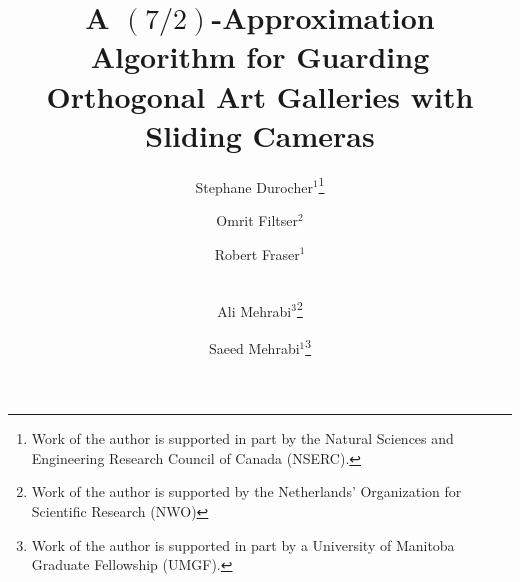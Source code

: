 \documentclass{llncs}
\begin{document}
\let\doendproof\endproof
\renewcommand\endproof{~\hfill\qed\doendproof}



\newcommand{\down}[1]{\raisebox{-.4ex}{#1}}



\makeatletter
    \renewcommand*{\@fnsymbol}[1]{\ensuremath{\ifcase#1\or *\or \dagger\or \S\or
       \mathsection\or \mathparagraph\or \|\or **\or \dagger\dagger
       \or \ddagger\ddagger \else\@ctrerr\fi}}
\makeatother

\newcommand*\samethanks[1][\value{footnote}]{\footnotemark[#1]}

\title{A \boldmath$(7/2)$-Approximation Algorithm for Guarding Orthogonal Art
Galleries with Sliding Cameras}

\author{
Stephane Durocher$^1$\thanks{{Work of the author is supported in part by the Natural Sciences and Engineering Research Council of Canada
(NSERC).}} \and 	
Omrit Filtser$^2$\and
Robert Fraser$^1$\and\\
Ali Mehrabi$^3$\thanks{{Work of the author is supported by the Netherlands' Organization for Scientific Research (NWO)}}\and
Saeed Mehrabi$^1$\thanks{{Work of the author is supported in part by a University of Manitoba Graduate Fellowship (UMGF).}}
}




\newcommand{\keywords}[1]{\par\addvspace\baselineskip
\noindent\keywordname\enspace\ignorespaces#1}
\newtheorem{observation}{Observation}{\bfseries}{\itshape}

\pagestyle{plain}

\maketitle
\end{document}
